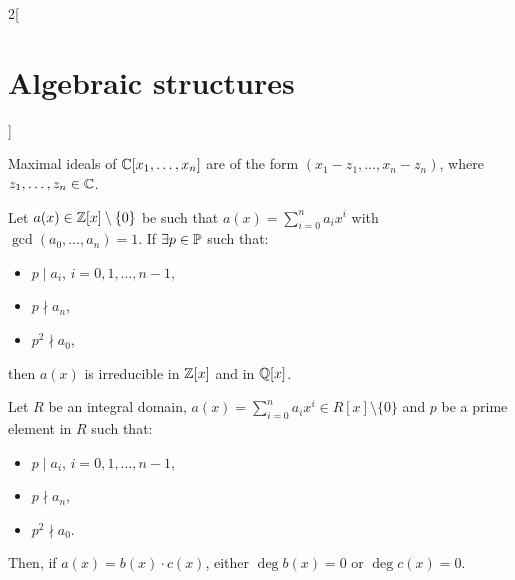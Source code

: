 \documentclass[../../../main.tex]{subfiles}
\begin{document}
\begin{multicols}{2}[\section{Algebraic structures}]
\begin{theorem}
    \end{theorem}
    \begin{theorem}
        Maximal ideals of $\mathbb{C}[x_1,\ldots,x_n]$ are of the form $(x_1-z_1,\ldots,x_n-z_n)$, where $z_1,\ldots,z_n\in\mathbb{C}$.
    \end{theorem}
    \begin{theorem}
        Let $a(x)\in\mathbb{Z}[x]\setminus\{0\}$ be such that $a(x)=\sum_{i=0}^na_ix^i$ with $\gcd(a_0,\ldots,a_n)=1$. If $\exists p\in\mathbb{P}$ such that:
        \begin{itemize}
            \item $p\mid a_i$, $i=0,1,\ldots,n-1$,
            \item $p\nmid a_n$,
            \item $p^2\nmid a_0$,
        \end{itemize}
        then $a(x)$ is irreducible in $\mathbb{Z}[x]$ and in $\mathbb{Q}[x]$.
    \end{theorem}
    \begin{theorem}
        Let $R$ be an integral domain, $a(x)=\sum_{i=0}^na_ix^i\in R[x]\setminus\{0\}$ and $p$ be a prime element in $R$ such that:
        \begin{itemize}
            \item $p\mid a_i$, $i=0,1,\ldots,n-1$,
            \item $p\nmid a_n$,
            \item $p^2\nmid a_0$.
        \end{itemize}
        Then, if $a(x)=b(x)\cdot c(x)$, either $\deg b(x)=0$ or $\deg c(x)=0$.
    \end{theorem}

\end{multicols}
\end{document}
